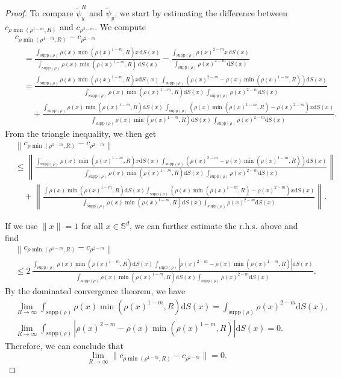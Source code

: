 \documentclass[11pt]{amsart}
\newcommand{\bbs}{\mathbb S}
\newcommand{\dx}{\mathrm{d}S (x)}
\newcommand{\supp}{\mathrm{supp}(\rho)}
\newcommand{\dm}{d} %
\begin{document}
\begin{proof}
To compare $\tilde{\psi}_y^R$ and $\tilde{\psi}_y$, we start by estimating the difference between $c_{\rho\min(\rho^{1-m},R)}$ and $c_{\rho^{2-m}}$. We compute
\begin{align*}
&c_{\rho\min(\rho^{1-m}, R)}-c_{\rho^{2-m}}\\[3pt]
&\quad = \frac{\int_{\supp}\rho(x)\min(\rho(x)^{1-m},R)x \, \dx}{\int_{\supp}\rho(x)\min(\rho(x)^{1-m},R)\, \dx}-\frac{\int_{\supp}\rho(x)^{2-m}x \, \dx}{\int_{\supp}\rho(x)^{2-m} \, \dx}\\[3pt]
&\quad = \frac{\int_{\supp} \rho(x)\min(\rho(x)^{1-m},R)x\dx \; \int_{\supp} \left(\rho(x)^{2-m}-\rho(x)\min(\rho(x)^{1-m},R) \right)\dx
}{\int_{\supp}\rho(x)\min(\rho(x)^{1-m},R)\dx \, \int_{\supp}\rho(x)^{2-m}\dx}\\[3pt]
&\qquad + \frac{\int_{\supp}\rho(x)\min(\rho(x)^{1-m},R)\dx \,\int_{\supp} \left(\rho(x)\min(\rho(x)^{1-m},R)-\rho(x)^{2-m} \right)x \dx
}{\int_{\supp}\rho(x)\min(\rho(x)^{1-m},R)\dx \, \int_{\supp}\rho(x)^{2-m}\dx}.
\end{align*}
From the triangle inequality, we then get
\begin{align*}
&\left \|c_{\rho\min(\rho^{1-m}, R)}-c_{\rho^{2-m}} \right\|\\[3pt]
&\leq\left\|\frac{\int_{\supp} \rho(x)\min(\rho(x)^{1-m},R)x\dx \, \int_{\supp} \left(\rho(x)^{2-m}-\rho(x)\min(\rho(x)^{1-m},R)\right)\dx
}{\int_{\supp}\rho(x)\min(\rho(x)^{1-m},R)\dx\, \int_{\supp}\rho(x)^{2-m}\dx}\right\|\\[3pt]
&\quad +\left\|\frac{\int\rho(x)\min(\rho(x)^{1-m},R)\dx\int_{\supp}\left(\rho(x)\min(\rho(x)^{1-m},R)-\rho(x)^{2-m} \right) x \dx
}{\int_{\supp}\rho(x)\min(\rho(x)^{1-m},R)\dx\int_{\supp}\rho(x)^{2-m}\dx}\right\|.
\end{align*}

If we use $\|x\|=1$ for all $x\in\bbs^\dm$, we can further estimate the r.h.s. above and find
\begin{align*}
&\left \|c_{\rho\min(\rho^{1-m}, R)}-c_{\rho^{2-m}} \right\|\\[3pt]
&\leq 2 \, \frac{\int_{\supp}\rho(x)\min(\rho(x)^{1-m},R)\dx \, \int_{\supp}|\rho(x)^{2-m}-\rho(x)\min(\rho(x)^{1-m},R)|\dx}{\int_{\supp}\rho(x)\min(\rho(x)^{1-m},R)\dx\int_{\supp}\rho(x)^{2-m}\dx}.
\end{align*}
By the dominated convergence theorem, we have
\begin{equation}
\label{eqn:2limR}
\begin{aligned}
&\lim_{R\to\infty}\int_{\supp}\rho(x)\min(\rho(x)^{1-m},R)\dx =\int_{\supp}\rho(x)^{2-m}\dx,\\
&\lim_{R\to\infty}\int_{\supp}|\rho(x)^{2-m}-\rho(x)\min(\rho(x)^{1-m},R)|\dx=0.
\end{aligned}
\end{equation}
Therefore, we can conclude that
\begin{equation}
\label{eqn:limR-normc}
\lim_{R\to\infty}\|c_{\rho\min(\rho^{1-m}, R)}-c_{\rho^{2-m}}\|=0.
\end{equation}


\end{proof}
\end{document}
